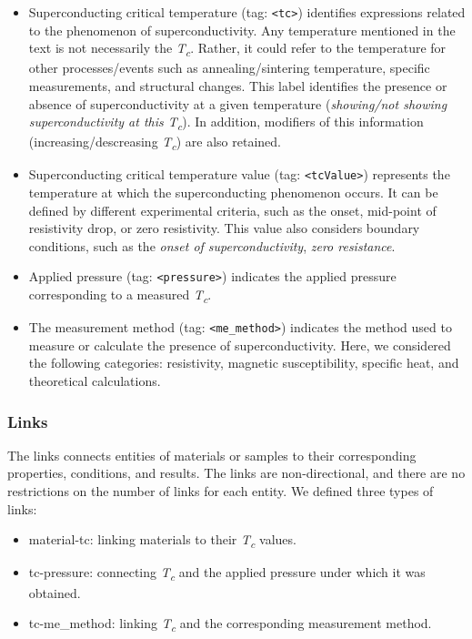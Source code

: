 \documentclass[fleqn,10pt]{wlscirep}
\begin{document}
\begin{itemize}
\item Superconducting critical temperature (tag: \texttt{<tc>}) identifies expressions related to the phenomenon of superconductivity. Any temperature mentioned in the text is not necessarily the \textit{T\textsubscript{c}}. Rather, it could refer to the temperature for other processes/events such as annealing/sintering temperature, specific measurements, and structural changes.
This label identifies the presence or absence of superconductivity at a given temperature (\textit{showing/not showing superconductivity at this T\textsubscript{c}}).
In addition, modifiers of this information (increasing/descreasing \textit{T\textsubscript{c}}) are also retained. 

\item Superconducting critical temperature value (tag: \texttt{<tcValue>}) represents the temperature at which the superconducting phenomenon occurs. 
It can be defined by different experimental criteria, such as the onset, mid-point of resistivity drop, or zero resistivity.
This value also considers boundary conditions, such as the \textit{onset of superconductivity}, \textit{zero resistance}. 

\item Applied pressure (tag: \texttt{<pressure>}) indicates the applied pressure corresponding to a measured \textit{T\textsubscript{c}}. 

\item The measurement method (tag: \texttt{<me\_method>}) indicates the method used to measure or calculate the presence of superconductivity. Here, we considered the following categories: resistivity, magnetic susceptibility, specific heat, and theoretical calculations. 
\end{itemize}

\FloatBarrier
\subsubsection*{Links}
The links connects entities of materials or samples to their corresponding properties, conditions, and results. 
The links are non-directional, and there are no restrictions on the number of links for each entity. 
We defined three types of links:

\begin{itemize}
    \item material-tc: linking materials to their \textit{T\textsubscript{c}} values.
    \item tc-pressure: connecting \textit{T\textsubscript{c}} and the applied pressure under which it was obtained.
    \item tc-me\_method: linking \textit{T\textsubscript{c}} and the corresponding measurement method. 
\end{itemize}
\end{document}

